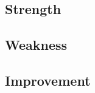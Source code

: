 \documentclass[../main]{subfiles}
\begin{document}
\subsection{Strength}

\subsection{Weakness}

\subsection{Improvement}
\end{document}
